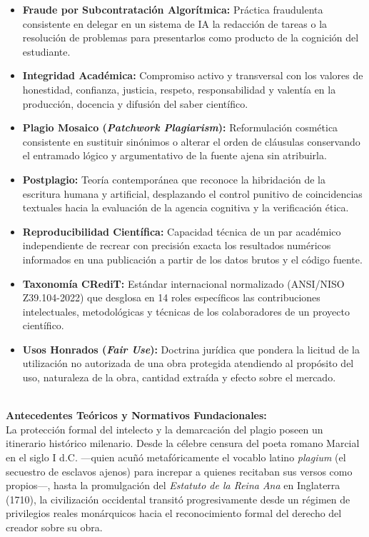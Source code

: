 \begin{itemize}
    \item \textbf{Fraude por Subcontratación Algorítmica:} Práctica fraudulenta consistente en delegar en un sistema de IA la redacción de tareas o la resolución de problemas para presentarlos como producto de la cognición del estudiante.
    \item \textbf{Integridad Académica:} Compromiso activo y transversal con los valores de honestidad, confianza, justicia, respeto, responsabilidad y valentía en la producción, docencia y difusión del saber científico.
    \item \textbf{Plagio Mosaico (\textit{Patchwork Plagiarism}):} Reformulación cosmética consistente en sustituir sinónimos o alterar el orden de cláusulas conservando el entramado lógico y argumentativo de la fuente ajena sin atribuirla.
    \item \textbf{Postplagio:} Teoría contemporánea que reconoce la hibridación de la escritura humana y artificial, desplazando el control punitivo de coincidencias textuales hacia la evaluación de la agencia cognitiva y la verificación ética.
    \item \textbf{Reproducibilidad Científica:} Capacidad técnica de un par académico independiente de recrear con precisión exacta los resultados numéricos informados en una publicación a partir de los datos brutos y el código fuente.
    \item \textbf{Taxonomía CRediT:} Estándar internacional normalizado (ANSI/NISO Z39.104-2022) que desglosa en 14 roles específicos las contribuciones intelectuales, metodológicas y técnicas de los colaboradores de un proyecto científico.
    \item \textbf{Usos Honrados (\textit{Fair Use}):} Doctrina jurídica que pondera la licitud de la utilización no autorizada de una obra protegida atendiendo al propósito del uso, naturaleza de la obra, cantidad extraída y efecto sobre el mercado.
\end{itemize}

\newpage
{}
\vspace*{0.8cm}
\\[0.8cm]

\textbf{Antecedentes Teóricos y Normativos Fundacionales:}\\[0.2cm]
La protección formal del intelecto y la demarcación del plagio poseen un itinerario histórico milenario. Desde la célebre censura del poeta romano Marcial en el siglo I d.C. ---quien acuñó metafóricamente el vocablo latino \textit{plagium} (el secuestro de esclavos ajenos) para increpar a quienes recitaban sus versos como propios---, hasta la promulgación del \textit{Estatuto de la Reina Ana} en Inglaterra (1710), la civilización occidental transitó progresivamente desde un régimen de privilegios reales monárquicos hacia el reconocimiento formal del derecho del creador sobre su obra.

